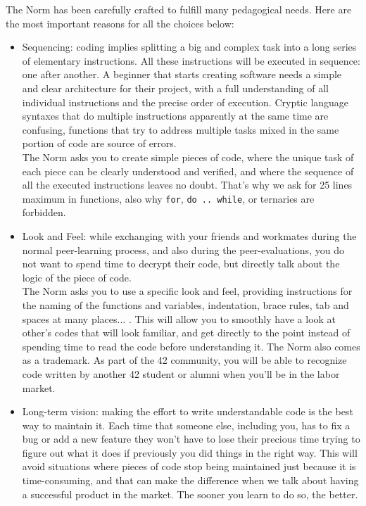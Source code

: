 \documentclass{42-en}
\begin{document}
    The Norm has been carefully crafted to fulfill many pedagogical needs. Here
    are the most important reasons for all the choices below:
    \begin{itemize}

    \item Sequencing: coding implies splitting a big and complex task into a long series
      of elementary instructions. All these instructions will be executed in sequence:
      one after another. A beginner that starts creating software needs a simple and clear
      architecture for their project, with a full understanding of all individual instructions
      and the precise order of execution. Cryptic language syntaxes that do multiple
      instructions apparently at the same time are confusing, functions that try to address
      multiple tasks mixed in the same portion of code are source of errors.\\
      The Norm asks you to create simple pieces of code, where the unique task of each piece
      can be clearly understood and verified, and where the sequence of all the executed
      instructions leaves no doubt. That's why we ask for 25 lines maximum in functions, also why
      \texttt{for}, \texttt{do .. while}, or ternaries are forbidden.

    \item Look and Feel: while exchanging with your friends and workmates during the
      normal peer-learning process, and also during the peer-evaluations, you do not
      want to spend time to decrypt their code, but directly talk about the
      logic of the piece of code.\\
      The Norm asks you to use a specific look and feel, providing instructions for the naming
      of the functions and variables, indentation, brace rules, tab and spaces at many places... .
      This will allow you to smoothly have a look at other's codes that will look familiar,
      and get directly to the point instead of spending time to read the code before understanding it.
      The Norm also comes as a trademark. As part of the 42 community, you will be able to
      recognize code written by another 42 student or alumni when you'll be in the labor market.

    \item Long-term vision: making the effort to write understandable code is the
      best way to maintain it. Each time that someone else, including you, has to fix a bug
      or add a new feature they won't have to lose their precious time trying to figure out
      what it does if previously you did things in the right way. This will avoid situations
      where pieces of code stop being maintained just because it is time-consuming, and that
      can make the difference when we talk about having a successful product in the market.
      The sooner you learn to do so, the better.


\end{itemize}
\end{document}
